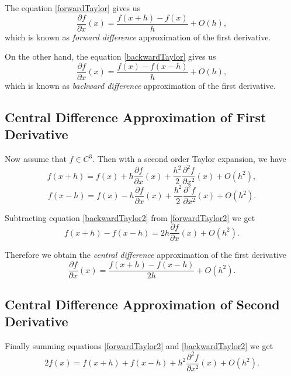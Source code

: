 The equation \eqref{forwardTaylor} gives us
\begin{equation}\label{fwd}
\frac{\partial f}{\partial x}(x) =  \frac{f(x+h)-f(x)}{h} + O(h),
\end{equation}
which is known as \textit{forward difference} approximation of the first derivative. 

On the other hand, the equation \eqref{backwardTaylor} gives us
\begin{equation}\label{bwd}
\frac{\partial f}{\partial x}(x) =  \frac{f(x)-f(x-h)}{h} + O(h),
\end{equation}
which is known as \textit{backward difference} approximation of the first derivative.

\subsection*{Central Difference Approximation of First Derivative}
Now assume that $f\in C^3$. Then with a second order Taylor expansion, we have
\begin{equation}\label{forwardTaylor2}
f(x+h) = f(x) + h \frac{\partial f}{\partial x}(x) + \frac{h^2}{2}\frac{\partial^2 f}{\partial x^2}(x) +O(h^2),
\end{equation}
\begin{equation}\label{backwardTaylor2}
f(x-h) = f(x) - h \frac{\partial f}{\partial x}(x) + \frac{h^2}{2}\frac{\partial^2 f}{\partial x^2}(x) +O(h^2).
\end{equation}

Subtracting equation \eqref{backwardTaylor2} from  \eqref{forwardTaylor2} we get
$$ f(x+h)-f(x-h) = 2h \frac{\partial f}{\partial x}(x) + O(h^2).$$

Therefore we obtain the \textit{central difference} approximation of the first derivative
\begin{equation}\label{cf1}
\frac{\partial f}{\partial x}(x) = \frac{f(x+h)-f(x-h)}{2h} + O(h^2).
\end{equation}

\subsection*{Central Difference Approximation of Second Derivative}
Finally summing equations \eqref{forwardTaylor2} and \eqref{backwardTaylor2} we get
$$2f(x) = f(x+h)+f(x-h)+ h^2 \frac{\partial^2 f}{\partial x^2}(x) + O(h^2).$$ 

